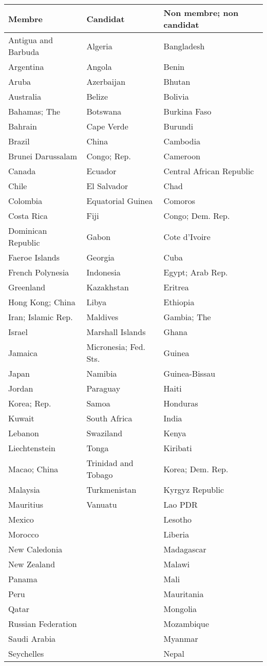 \documentclass[a4paper]{article}
\begin{document}
\begin{tabular}{|l|l|l|}
\hline
Membre&Candidat&Non membre; non candidat\\
\hline
Antigua and Barbuda&Algeria&Bangladesh\\
\hline
Argentina&Angola&Benin\\
\hline
Aruba&Azerbaijan&Bhutan\\
\hline
Australia&Belize&Bolivia\\
\hline
Bahamas; The&Botswana&Burkina Faso\\
\hline
Bahrain&Cape Verde&Burundi\\
\hline
Brazil&China&Cambodia\\
\hline
Brunei Darussalam&Congo; Rep.&Cameroon\\
\hline
Canada&Ecuador&Central African Republic\\
\hline
Chile&El Salvador&Chad\\
\hline
Colombia&Equatorial Guinea&Comoros\\
\hline
Costa Rica&Fiji&Congo; Dem. Rep.\\
\hline
Dominican Republic&Gabon&Cote d'Ivoire\\
\hline
Faeroe Islands&Georgia&Cuba\\
\hline
French Polynesia&Indonesia&Egypt; Arab Rep.\\
\hline
Greenland&Kazakhstan&Eritrea\\
\hline
Hong Kong; China&Libya&Ethiopia\\
\hline
Iran; Islamic Rep.&Maldives&Gambia; The\\
\hline
Israel&Marshall Islands&Ghana\\
\hline
Jamaica&Micronesia; Fed. Sts.&Guinea\\
\hline
Japan&Namibia&Guinea-Bissau\\
\hline
Jordan&Paraguay&Haiti\\
\hline
Korea; Rep.&Samoa&Honduras\\
\hline
Kuwait&South Africa&India\\
\hline
Lebanon&Swaziland&Kenya\\
\hline
Liechtenstein&Tonga&Kiribati\\
\hline
Macao; China&Trinidad and Tobago&Korea; Dem. Rep.\\
\hline
Malaysia&Turkmenistan&Kyrgyz Republic\\
\hline
Mauritius&Vanuatu&Lao PDR\\
\hline
Mexico&&Lesotho\\
\hline
Morocco&&Liberia\\
\hline
New Caledonia&&Madagascar\\
\hline
New Zealand&&Malawi\\
\hline
Panama&&Mali\\
\hline
Peru&&Mauritania\\
\hline
Qatar&&Mongolia\\
\hline
Russian Federation&&Mozambique\\
\hline
Saudi Arabia&&Myanmar\\
\hline
Seychelles&&Nepal\\
\hline
\end{tabular}
\end{document}
